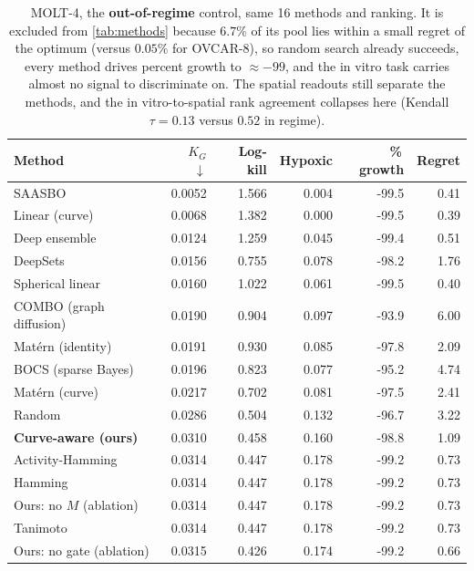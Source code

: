 \documentclass{article}
\begin{document}
\begin{table}[t]
\caption{MOLT-4, the \textbf{out-of-regime} control, same 16 methods and
ranking. It is excluded from \cref{tab:methods} because $6.7\%$ of its pool
lies within a small regret of the optimum (versus $0.05\%$ for OVCAR-8), so
random search already succeeds, every method drives percent growth to
$\approx -99$, and the in vitro task carries almost no signal to
discriminate on. The spatial readouts still separate the methods, and the
in vitro-to-spatial rank agreement collapses here (Kendall
$\tau = 0.13$ versus $0.52$ in regime).}
\label{tab:molt4}
\vskip 0.1in
\centering
\footnotesize
\setlength{\tabcolsep}{4pt}
\begin{tabular}{lrrrrr}
\toprule
Method & $K_G$ $\downarrow$ & Log-kill & Hypoxic & \%\,growth & Regret \\
\midrule
SAASBO & 0.0052 & 1.566 & 0.004 & -99.5 & 0.41 \\
Linear (curve) & 0.0068 & 1.382 & 0.000 & -99.5 & 0.39 \\
Deep ensemble & 0.0124 & 1.259 & 0.045 & -99.4 & 0.51 \\
DeepSets & 0.0156 & 0.755 & 0.078 & -98.2 & 1.76 \\
Spherical linear & 0.0160 & 1.022 & 0.061 & -99.5 & 0.40 \\
COMBO (graph diffusion) & 0.0190 & 0.904 & 0.097 & -93.9 & 6.00 \\
Mat\'ern (identity) & 0.0191 & 0.930 & 0.085 & -97.8 & 2.09 \\
BOCS (sparse Bayes) & 0.0196 & 0.823 & 0.077 & -95.2 & 4.74 \\
Mat\'ern (curve) & 0.0217 & 0.702 & 0.081 & -97.5 & 2.41 \\
Random & 0.0286 & 0.504 & 0.132 & -96.7 & 3.22 \\
\textbf{Curve-aware (ours)} & 0.0310 & 0.458 & 0.160 & -98.8 & 1.09 \\
Activity-Hamming & 0.0314 & 0.447 & 0.178 & -99.2 & 0.73 \\
Hamming & 0.0314 & 0.447 & 0.178 & -99.2 & 0.73 \\
Ours: no $M$ (ablation) & 0.0314 & 0.447 & 0.178 & -99.2 & 0.73 \\
Tanimoto & 0.0314 & 0.447 & 0.178 & -99.2 & 0.73 \\
Ours: no gate (ablation) & 0.0315 & 0.426 & 0.174 & -99.2 & 0.66 \\
\bottomrule
\end{tabular}
\vskip -0.1in
\end{table}
\end{document}
